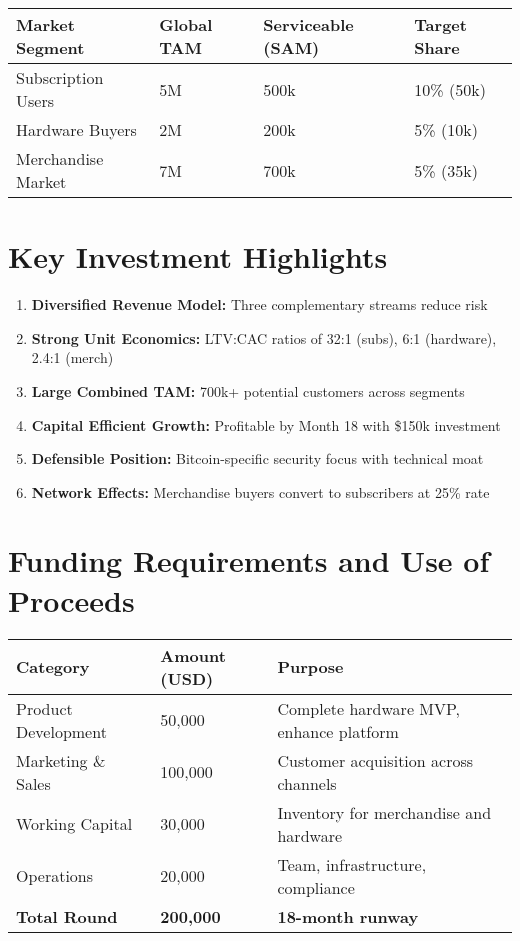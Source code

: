\documentclass[11pt]{article}
\begin{document}
\begin{table}[H]
\centering
\begin{tabularx}{\linewidth}{l Y Y Y}
\toprule
Market Segment & Global TAM & Serviceable (SAM) & Target Share \\\midrule
Subscription Users & 5M & 500k & 10\% (50k) \\
Hardware Buyers & 2M & 200k & 5\% (10k) \\
Merchandise Market & 7M & 700k & 5\% (35k) \\
\bottomrule
\end{tabularx}
\end{table}

\section{Key Investment Highlights}

\begin{enumerate}
  \item \textbf{Diversified Revenue Model:} Three complementary streams reduce risk
  \item \textbf{Strong Unit Economics:} LTV:CAC ratios of 32:1 (subs), 6:1 (hardware), 2.4:1 (merch)
  \item \textbf{Large Combined TAM:} 700k+ potential customers across segments
  \item \textbf{Capital Efficient Growth:} Profitable by Month 18 with \$150k investment
  \item \textbf{Defensible Position:} Bitcoin-specific security focus with technical moat
  \item \textbf{Network Effects:} Merchandise buyers convert to subscribers at 25\% rate
\end{enumerate}

\section{Funding Requirements and Use of Proceeds}

\begin{table}[H]
\centering
\begin{tabularx}{\linewidth}{l Y Y}
\toprule
Category & Amount (USD) & Purpose \\\midrule
Product Development & 50,000 & Complete hardware MVP, enhance platform \\
Marketing \& Sales & 100,000 & Customer acquisition across channels \\
Working Capital & 30,000 & Inventory for merchandise and hardware \\
Operations & 20,000 & Team, infrastructure, compliance \\
\textbf{Total Round} & \textbf{200,000} & \textbf{18-month runway} \\
\bottomrule
\end{tabularx}
\end{table}
\end{document}
